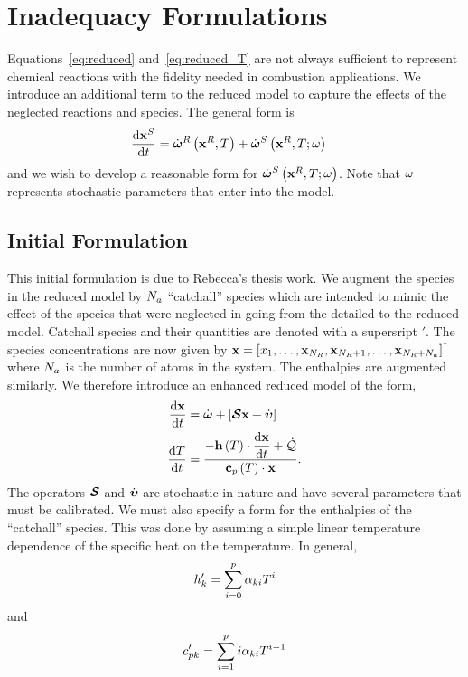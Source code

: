\section{Inadequacy Formulations}
Equations~\eqref{eq:reduced} and~\eqref{eq:reduced_T} are not always sufficient to represent 
chemical reactions with the fidelity needed in combustion applications.  We introduce an 
additional term to the reduced model to capture the effects of the neglected reactions and 
species.  The general form is 
\begin{align}
  \frac{\mathrm{d} \mathbf{x}^{S}}{\mathrm{d} t} &= \dot{\boldsymbol{\omega}}^{R}\left(\mathbf{x}^{R}, T\right) + \dot{\boldsymbol{\omega}}^{S}\left(\mathbf{x}^{R}, T; \omega\right)
\end{align}
and we wish to develop a reasonable form for $\dot{\boldsymbol{\omega}}^{S}\left(\mathbf{x}^{R}, T; \omega\right)$.  Note that $\omega$ 
represents stochastic parameters that enter into the model.

\subsection{Initial Formulation}
This initial formulation is due to Rebecca's thesis work.  We augment the species in the 
reduced model by $N_{a}$ ``catchall'' species which are intended to mimic the effect of the 
species that were neglected in going from the detailed to the reduced model.  Catchall 
species and their quantities are denoted with a supersript $\prime$.  The species 
concentrations are now given by 
$\mathbf{x} = \left[x_{1}, \ldots, \mathbf{x}_{N_{R}}, \mathbf{x}_{N_{R}+1}, \ldots, \mathbf{x}_{N_{R} + N_{a}}\right]^{\dagger}$ 
where $N_{a}$ is the number of atoms in the system.  The enthalpies are augmented similarly.  
We therefore introduce an enhanced reduced model of the form,
\begin{align}
  \frac{\mathrm{d} \mathbf{x}}{\mathrm{d} t} &= \dot{\boldsymbol{\omega}} + \left[\boldsymbol{\mathcal{S}} \mathbf{x} + \dot{\boldsymbol{\upsilon}}\right] \label{eq:inad_reb} \\
  \frac{\mathrm{d} T}{\mathrm{d} t}  &= \frac{-\displaystyle \mathbf{h}\left(T\right)\cdot\frac{\mathrm{d} \mathbf{x}}{\mathrm{d} t} + \dot{\mathcal{Q}}}
                         {\displaystyle \mathbf{c}_{p}\left(T\right)\cdot\mathbf{x}}. \label{eq:energy_reb}
\end{align}
The operators $\boldsymbol{\mathcal{S}}$ and $\dot{\boldsymbol{\upsilon}}$ are stochastic in nature and have several parameters that 
must be calibrated.  We must also specify a form for the enthalpies of the ``catchall'' 
species.  This was done by assuming a simple linear temperature dependence of the specific 
heat on the temperature.  In general,  
\begin{align}
  h_{k}^{\prime} = \sum_{i=0}^{p}{\alpha_{ki}T^{i}}
\end{align}
and 
\begin{align}
  c_{pk}^{\prime} = \sum_{i=1}^{p}{i\alpha_{ki}T^{i-1}}
\end{align}
